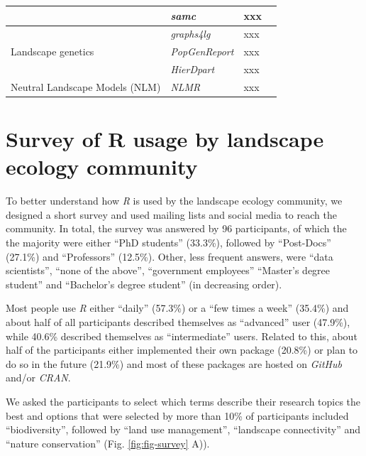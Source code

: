 \documentclass[smallextended]{svjour3}       %
\begin{document}
\begin{landscape}
\begin{table}
\begin{tabularx}{0.9\linewidth}{XXXX}
      & \textit{samc} & xxx & \cite{Marx2020} \\
      \hline
      \multirow{3}{*}{Landscape genetics} & \textit{graphs4lg} & xxx & \cite{Savary2020} \\
      & \textit{PopGenReport} & xxx & \cite{Adamack2014,Gruber2015} \\
      & \textit{HierDpart} & xxx & \cite{Qin2019} \\
      \hline
      Neutral Landscape Models (NLM) & \textit{NLMR} & xxx & \cite{Sciaini2018} \\
      \hline
    \end{tabularx}
  \end{table}

\end{landscape}

\hypertarget{survey-of-r-usage-by-landscape-ecology-community}{%
\section{Survey of R usage by landscape ecology community}\label{survey-of-r-usage-by-landscape-ecology-community}}

To better understand how \emph{R} is used by the landscape ecology community, we designed a short survey and used mailing lists and social media to reach the community.
In total, the survey was answered by 96 participants, of which the the majority were either ``PhD students'' (33.3\%), followed by ``Post-Docs'' (27.1\%) and ``Professors'' (12.5\%). Other, less frequent answers, were ``data scientists'', ``none of the above'', ``government employees'' ``Master's degree student'' and ``Bachelor's degree student'' (in decreasing order).

Most people use \emph{R} either ``daily'' (57.3\%) or a ``few times a week'' (35.4\%) and about half of all participants described themselves as ``advanced'' user (47.9\%), while 40.6\% described themselves as ``intermediate'' users.
Related to this, about half of the participants either implemented their own package (20.8\%) or plan to do so in the future (21.9\%) and most of these packages are hosted on \emph{GitHub} and/or \emph{CRAN}.

We asked the participants to select which terms describe their research topics the best and options that were selected by more than 10\% of participants included ``biodiversity'', followed by ``land use management'', ``landscape connectivity'' and ``nature conservation'' (Fig. \ref{fig:fig-survey} A)).
\end{document}
